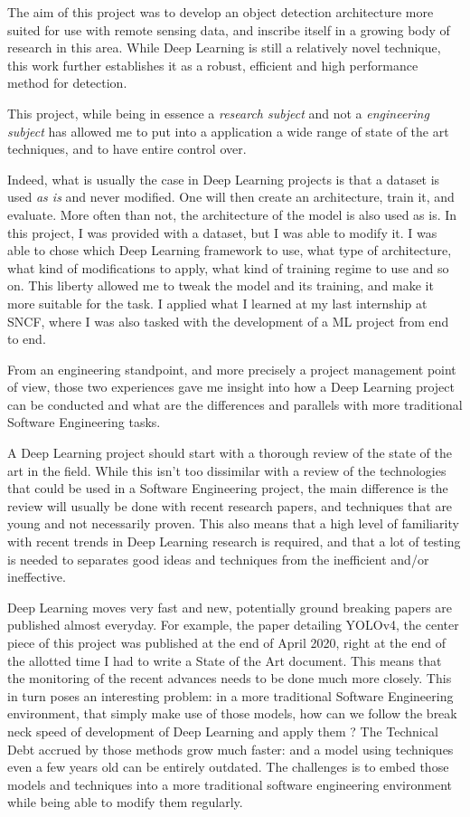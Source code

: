 The aim of this project was to develop an object detection architecture more suited for use with remote sensing data, and inscribe itself in a growing body of research in this area. While Deep Learning is still a relatively novel technique, this work further establishes it as a robust, efficient and high performance method for detection. 

This project, while being in essence a \textit{research subject} and not a \textit{engineering subject} has allowed me to put into a application a wide range of state of the art techniques, and to have entire control over. 

Indeed, what is usually the case in Deep Learning projects is that a dataset is used \textit{as is} and never modified. One will then create an architecture, train it, and evaluate. More often than not, the architecture of the model is also used as is. In this project, I was provided with a dataset, but I was able to modify it. I was able to chose which Deep Learning framework to use, what type of architecture, what kind of modifications to apply, what kind of training regime to use and so on. This liberty allowed me to tweak the model and its training, and make it more suitable for the task. I applied what I learned at my last internship at SNCF, where I was also tasked with the development of a ML project from end to end. 

From an engineering standpoint, and more precisely a project management point of view, those two experiences gave me insight into how a Deep Learning project can be conducted and what are the differences and parallels with more traditional Software Engineering tasks. 

A Deep Learning project should start with a thorough review of the state of the art in the field. While this isn't too dissimilar with a review of the technologies that could be used in a Software Engineering project, the main difference is the review will usually be done with recent research papers, and techniques that are young and not necessarily proven. This also means that a high level of familiarity with recent trends in Deep Learning research is required, and that a lot of testing is needed to separates good ideas and techniques from the inefficient and/or ineffective.

 Deep Learning moves very fast and new, potentially ground breaking papers are published almost everyday. For example, the paper detailing YOLOv4, the center piece of this project was published at the end of April 2020, right at the end of the allotted time I had to write a State of the Art document. This means that the monitoring of the recent advances needs to be done much more closely. This in turn poses an interesting problem: in a more traditional Software Engineering environment, that simply make use of those models, how can we follow the break neck speed of development of Deep Learning and apply them ? The Technical Debt accrued by those methods grow much faster: and a model using techniques even a few years old can be entirely outdated. The challenges is to embed those models and techniques into a more traditional software engineering environment while being able to modify them regularly. 


